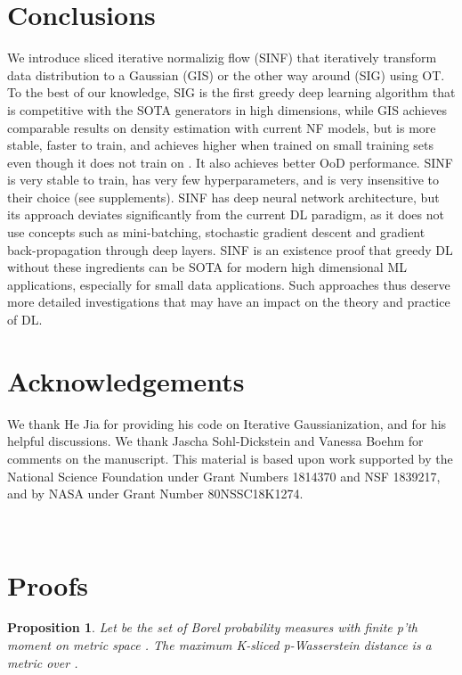 \documentclass{article}
\newtheorem{prop}{Proposition}
\begin{document}
\section{Conclusions}

We introduce sliced iterative normalizig flow (SINF) that iteratively transform data distribution to a Gaussian (GIS) or the other way around (SIG) using OT. To the best of our knowledge, SIG is the first greedy deep learning algorithm that is competitive with the SOTA generators in high dimensions, while GIS achieves comparable results on density estimation with current NF models, but is more stable, faster to train, and achieves higher  when trained on small training sets even though it does not train on . It also achieves better OoD performance. SINF is very stable to train, has very few hyperparameters, and is very insensitive to their choice (see supplements).
SINF has deep neural network architecture, but its approach deviates significantly from the current DL paradigm, as it does not use concepts such as mini-batching, stochastic gradient descent and gradient back-propagation through deep layers. 
SINF is an existence proof that greedy DL without these ingredients can be SOTA for modern high dimensional ML applications, especially for small data applications. Such approaches thus deserve more detailed investigations that may have an impact on the theory and practice of DL. 




\section*{Acknowledgements}

We thank He Jia for providing his code on Iterative Gaussianization, and for his helpful discussions. We thank Jascha Sohl-Dickstein and Vanessa Boehm for comments on the manuscript. This material is based upon work supported by the National Science Foundation under Grant Numbers 1814370 and NSF 1839217, and by NASA under Grant Number 80NSSC18K1274. 










\newpage
\ 
\newpage
\appendix
\section{Proofs}
\begin{prop}
\label{prop:max-K-SWD}
Let  be the set of Borel probability measures with finite p’th moment on metric space . The maximum K-sliced p-Wasserstein distance is a metric over .
\end{prop}
\end{document}
